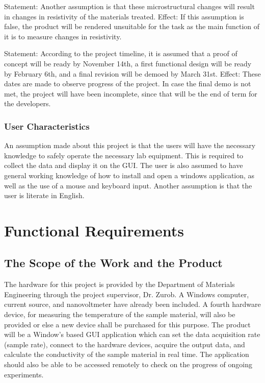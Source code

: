 \documentclass[12pt, titlepage]{article}
\begin{document}
Statement: Another assumption is that these microstructural changes will result in changes in resistivity of the materials treated. 
Effect: If this assumption is false, the product will be rendered unsuitable for the task as the main function of it is to measure changes in resistivity.

Statement: According to the project timeline, it is assumed that a proof of concept will be ready by November 14th, a first functional design will be ready by February 6th, and a final revision will be demoed by March 31st.
Effect: These dates are made to observe progress of the project. In case the final demo is not met, the project will have been incomplete, since that will be the end of term for the developers.

\subsubsection{User Characteristics}
An assumption made about this project is that the users will have the necessary knowledge to safely operate the necessary lab equipment. This is required to collect the data and display it on the GUI. 
The user is also assumed to have general working knowledge of how to install and open a windows application, as well as the use of a mouse and keyboard input. Another assumption is that the user is literate in English.

\section{Functional Requirements}
\subsection{The Scope of the Work and the Product}

The hardware for this project is provided by the Department of Materials Engineering through the project supervisor, Dr. Zurob. A Windows computer, current source, and nanovoltmeter have already been included. A fourth hardware device, for measuring the temperature of the sample material, will also be provided or else a new device shall be purchased for this purpose. The product will be a Window's based GUI application which can set the data acquisition rate (sample rate), connect to the hardware devices, acquire the output data, and calculate the conductivity of the sample material in real time. The application should also be able to be accessed remotely to check on the progress of ongoing experiments. \\
\end{document}
